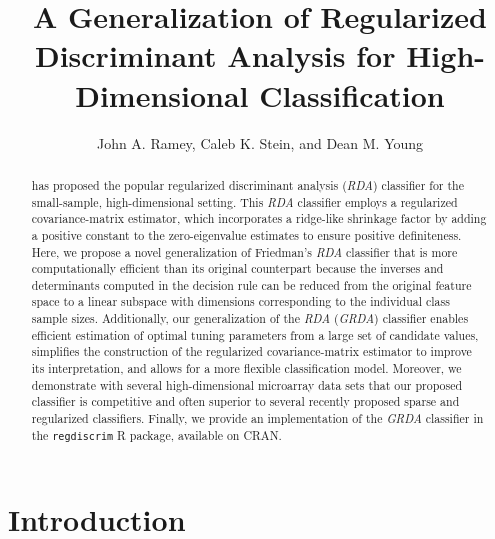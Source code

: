 \documentclass[11pt]{article}
\title{A Generalization of Regularized Discriminant Analysis for High-Dimensional Classification}
\author{John A. Ramey, Caleb K. Stein, and Dean M. Young}
\begin{document}
\newtheorem{cor}{Corollary}
\newtheorem{lemma}{Lemma}
\newtheorem{proposition}{Proposition}
\newtheorem{thm}{Theorem}


\doublespacing

\maketitle

\begin{abstract}
\cite{Friedman:1989tm} has proposed the popular regularized discriminant analysis (\emph{RDA}) classifier for the small-sample, high-dimensional setting. This \emph{RDA} classifier employs a regularized covariance-matrix estimator, which incorporates a ridge-like shrinkage factor by adding a positive constant to the zero-eigenvalue estimates to ensure positive definiteness. Here, we propose a novel generalization of Friedman's \emph{RDA} classifier that is more computationally efficient than its original counterpart because the inverses and determinants computed in the decision rule can be reduced from the original feature space to a linear subspace with dimensions corresponding to the individual class sample sizes. Additionally, our generalization of the \emph{RDA} (\emph{GRDA}) classifier enables efficient estimation of optimal tuning parameters from a large set of candidate values, simplifies the construction of the regularized covariance-matrix estimator to improve its interpretation, and allows for a more flexible classification model. Moreover, we demonstrate with several high-dimensional microarray data sets that our proposed classifier is competitive and often superior to several recently proposed sparse and regularized classifiers. Finally, we provide an implementation of the \emph{GRDA} classifier in the {\tt regdiscrim} R package, available on CRAN.
\end{abstract}

\section{Introduction}
\end{document}
